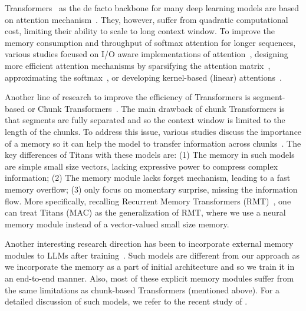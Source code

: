 Transformers~\citep{transformers} as the de facto backbone for many deep learning models are based on attention mechanism~\citep{bahdanau2014neural}. They, however, suffer from quadratic computational cost, limiting their ability to scale to long context window. To improve the memory consumption and throughput of softmax attention for longer sequences, various studies focused on I/O aware implementations of attention~\citep{flashattention-1, dao2024flashattention}, designing more efficient attention mechanisms by sparsifying the attention matrix~\citep{choromanski2021rethinking, dai2019transformerxl, chen2021scatterbrain, roy2021efficient, chen2021scatterbrain, dong2024flex}, approximating the softmax~\citep{arora2024simple}, or developing kernel-based (linear) attentions~\citep{kacham2024polysketchformer, schlag2021linear, yang2024gatedattn, aksenov2024linear}.

Another line of research to improve the efficiency of Transformers is segment-based or Chunk Transformers~\citep{dai2019transformerxl}. The main drawback of chunk Transformers is that segments are fully separated and so the context window is limited to the length of the chunks. To address this issue, various studies discuss the importance of a memory so it can help the model to transfer information across chunks~\citep{bulatov2022recurrent, rodkin2024associative, wu2020memformer, zancato2024bmojo, hutchins2022block, feng2022learn, hutchins2022block, bulatov2023scaling, wang2019r, wu2020memformer, zancato2024bmojo}. The key differences of Titans with these models are: (1) The memory in such models are simple small size vectors, lacking expressive power to compress complex information; (2) The memory module lacks forget mechanism, leading to a fast memory overflow; (3) only focus on momentary surprise, missing the information flow. More specifically, recalling Recurrent Memory Transformers (RMT)~\citep{bulatov2022recurrent, rodkin2024associative, bulatov2023scaling}, one can treat Titans (MAC) as the generalization of RMT, where we use a neural memory module instead of a vector-valued small size memory. 



Another interesting research direction has been to incorporate external memory modules to LLMs after training~\citep{he2024camelot, Khandelwal2020Generalization, wang2024memoryllm}. Such models are different from our approach as we incorporate the memory as a part of initial architecture and so we train it in an end-to-end manner. Also, most of these explicit memory modules suffer from the same limitations as chunk-based Transformers (mentioned above). For a detailed discussion of such models, we refer to the recent study of \citet{wang2024towards}.



